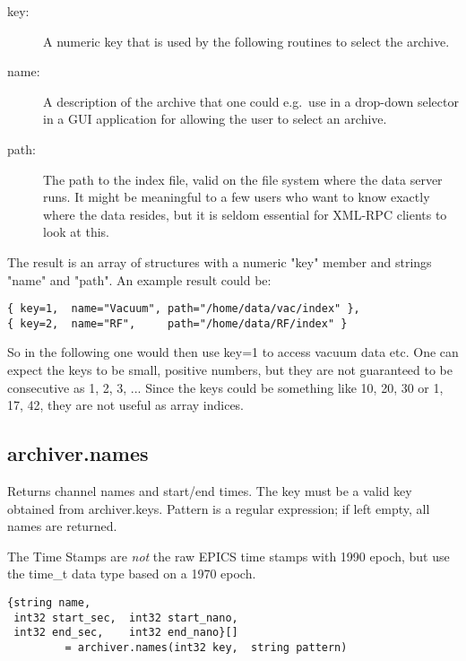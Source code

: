\begin{description}
\item[\sffamily key:] A numeric key that is used by the following
                      routines to select the archive.
\item[\sffamily name:] A description of the archive that one could
                       e.g.\ use in a drop-down selector in a GUI
                       application for allowing the user to select an archive.
\item[\sffamily path:] The path to the index file,  valid on the file
                       system where the data server runs.
                       It might be meaningful to a few users who want to
                       know exactly where the data resides,  but it is
                       seldom essential for XML-RPC clients to look at this.
\end{description}

\noindent The result is an array of structures with a numeric "key"
member and strings "name" and "path".
An example result could be:
\begin{lstlisting}[keywordstyle=\sffamily]
{ key=1,  name="Vacuum", path="/home/data/vac/index" },
{ key=2,  name="RF",     path="/home/data/RF/index" }
\end{lstlisting}

\noindent So in the following one would then use key=1 to access
vacuum data etc. One can expect the keys to be small,  positive
numbers,  but they are not guaranteed to be consecutive as 1, 2, 3,
... Since the keys could be something like 10,  20, 30 or 1, 17, 42,
they are not useful as array indices.

\subsection{archiver.names} %
Returns channel names and start/end times.
The key must be a valid key obtained from archiver.keys.
Pattern is a regular expression;
if left empty,  all names are returned.

\NOTE The Time Stamps are \emph{not} the raw EPICS time stamps with 1990 epoch, 
but use the time\_t data type based on a 1970 epoch.

\begin{lstlisting}[keywordstyle=\sffamily]
{string name, 
 int32 start_sec,  int32 start_nano,
 int32 end_sec,    int32 end_nano}[] 
         = archiver.names(int32 key,  string pattern)
\end{lstlisting}

